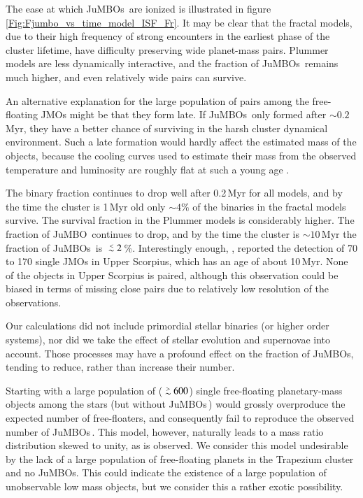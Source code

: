 \documentclass[submission,phys]{lib/SciPost}
\def\apgt{\ {\raise-.5ex\hbox{$\buildrel>\over\sim$}}\ }
\def\aplt{\ {\raise-.5ex\hbox{$\buildrel<\over\sim$}}\ }
\newcommand{\jumbo}{\mbox{JuMBO}}
\newcommand{\jumbos}{\mbox{JuMBOs}}
\begin{document}
The ease at which \jumbos\, are ionized is illustrated in
figure\,\ref{Fig:Fjumbo_vs_time_model_ISF_Fr}. It may be clear that
the fractal models, due to their high frequency of strong encounters
in the earliest phase of the cluster lifetime, have difficulty preserving wide
planet-mass pairs. Plummer models are less dynamically interactive,
and the fraction of \jumbos\, remains much higher, and even relatively
wide pairs can survive.

An alternative explanation for the large population of pairs among the
free-floating JMOs might be that they form late.  If \jumbos\, only
formed after $\sim 0.2$\,Myr, they have a better chance of surviving in
the harsh cluster dynamical environment.  Such a late formation would
hardly affect the estimated mass of the objects, because the cooling
curves used to estimate their mass from the observed temperature and
luminosity are roughly flat at such a young age
\cite{2000MNRAS.314..858L}.

The binary fraction continues to drop well after 0.2\,Myr for all models, 
and by the time the cluster is 1\,Myr old only $\sim 4\%$ of the binaries in the
fractal models survive. The survival fraction in the Plummer models is
considerably higher. The fraction of \jumbo\, continues to
drop, and by the time the cluster is $\sim 10$\,Myr the fraction of
\jumbos\ is $\aplt 2$\,\%.  Interestingly enough,
\cite{2022NatAs...6...89M}, reported the detection of 70 to 170 single
JMOs in Upper Scorpius, which has an age of about
10\,Myr.  None of the objects in Upper Scorpius is paired, although
this observation could be biased in terms of missing close pairs due
to relatively low resolution of the observations. 

Our calculations did not include primordial
stellar binaries (or higher order systems), nor did we take the effect
of stellar evolution and supernovae into account. Those processes may
have a profound effect on the fraction of \jumbos, tending to reduce,
rather than increase their number.

Starting with a large population of ($\apgt 600$) single free-floating
planetary-mass objects among the stars (but without \jumbos\,) would
grossly overproduce the expected number of free-floaters, and
consequently fail to reproduce the observed number of \jumbos\,.  This
model, however, naturally leads to a mass ratio distribution skewed to
unity, as is observed. We consider this model undesirable by the lack
of a large population of free-floating planets in the Trapezium
cluster and no \jumbos. This could indicate the existence of a large
population of unobservable low mass objects, but we consider this a
rather exotic possibility.
\end{document}
